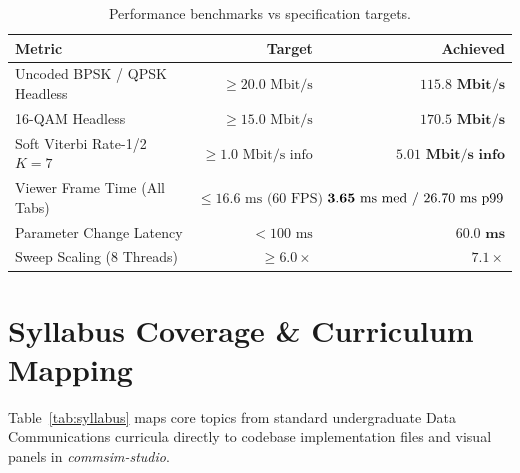 \documentclass[10pt,twocolumn]{article}
\begin{document}
\begin{table}[htbp]
\centering
\small
\begin{tabular}{@{}lrr@{}}
\toprule
\textbf{Metric} & \textbf{Target} & \textbf{Achieved} \\
\midrule
Uncoded BPSK / QPSK Headless & $\ge 20.0\text{ Mbit/s}$ & $\mathbf{115.8\text{ Mbit/s}}$ \\
16-QAM Headless & $\ge 15.0\text{ Mbit/s}$ & $\mathbf{170.5\text{ Mbit/s}}$ \\
Soft Viterbi Rate-1/2 $K=7$ & $\ge 1.0\text{ Mbit/s info}$ & $\mathbf{5.01\text{ Mbit/s info}}$ \\
Viewer Frame Time (All Tabs) & $\le 16.6\text{ ms (60 FPS)}$ & $\mathbf{3.65\text{ ms med / 26.70\text{ ms p99}}}$ \\
Parameter Change Latency & $< 100\text{ ms}$ & $\mathbf{60.0\text{ ms}}$ \\
Sweep Scaling (8 Threads) & $\ge 6.0\times$ & $\mathbf{7.1\times}$ \\
\bottomrule
\end{tabular}
\caption{Performance benchmarks vs specification targets.}
\label{tab:perf}
\end{table}

\section{Syllabus Coverage \& Curriculum Mapping}

Table~\ref{tab:syllabus} maps core topics from standard undergraduate Data Communications curricula directly to codebase implementation files and visual panels in \textit{commsim-studio}.
\end{document}
